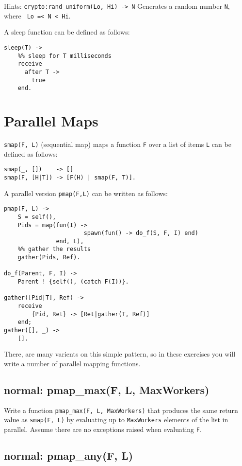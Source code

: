 \documentclass[12pt]{hitec}
\begin{document}
Hints: \verb+crypto:rand_uniform(Lo, Hi) -> N+
Generates a random number \verb+N+, where \verb+ Lo =< N < Hi+.

A sleep function can be defined as follows:

\begin{Verbatim}
sleep(T) ->
    %% sleep for T milliseconds
    receive
      after T ->
        true
    end.
\end{Verbatim}

\section{Parallel Maps}

\verb+smap(F, L)+ (sequential map) maps a function \verb+F+ over a
list of items \verb+L+  can be defined as follows:

\begin{Verbatim}
smap(_, [])    -> []
smap(F, [H|T]) -> [F(H) | smap(F, T)].
\end{Verbatim}

A parallel version \verb+pmap(F,L)+ can be written as follows:
\begin{Verbatim}
pmap(F, L) -> 
    S = self(),
    Pids = map(fun(I) -> 
                       spawn(fun() -> do_f(S, F, I) end)
               end, L),
    %% gather the results
    gather(Pids, Ref).

do_f(Parent, F, I) ->                                          
    Parent ! {self(), (catch F(I))}.

gather([Pid|T], Ref) ->
    receive
        {Pid, Ret} -> [Ret|gather(T, Ref)]
    end;
gather([], _) ->
    [].
\end{Verbatim}

There, are many varients on this simple pattern, so in these exercises
you will write a number of parallel mapping functions.

\subsection{normal: pmap\_max(F, L, MaxWorkers)}

Write a function \verb+pmap_max(F, L, MaxWorkers)+ that produces the same return
value as \verb+smap(F, L)+ by evaluating up to \verb+MaxWorkers+ elements of the list
in parallel. Assume there are no exceptions raised when evaluating \verb+F+.

\subsection{normal: pmap\_any(F, L)}
\end{document}

